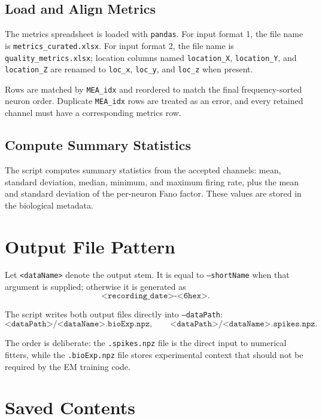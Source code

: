 \documentclass[11pt]{article}
\begin{document}
\subsection{Load and Align Metrics}

The metrics spreadsheet is loaded with \texttt{pandas}. For input format 1,
the file name is \texttt{metrics\_curated.xlsx}. For input format 2, the
file name is \texttt{quality\_metrics.xlsx}; location columns named
\texttt{location\_X}, \texttt{location\_Y}, and \texttt{location\_Z} are
renamed to \texttt{loc\_x}, \texttt{loc\_y}, and \texttt{loc\_z} when
present.

Rows are matched by \texttt{MEA\_idx} and reordered to match the final
frequency-sorted neuron order. Duplicate \texttt{MEA\_idx} rows are treated
as an error, and every retained channel must have a corresponding metrics
row.

\subsection{Compute Summary Statistics}

The script computes summary statistics from the accepted channels:
mean, standard deviation, median, minimum, and maximum firing rate, plus
the mean and standard deviation of the per-neuron Fano factor. These values
are stored in the biological metadata.

\section{Output File Pattern}
\label{sec:files}

Let \texttt{<dataName>} denote the output stem. It is equal to
\texttt{--shortName} when that argument is supplied; otherwise it is
generated as
\[
\texttt{<recording\_date>-<6hex>}.
\]

The script writes both output files directly into \texttt{--dataPath}:
\[
\texttt{<dataPath>/<dataName>.bioExp.npz},
\qquad
\texttt{<dataPath>/<dataName>.spikes.npz}.
\]

The order is deliberate: the \texttt{.spikes.npz} file is the direct input
to numerical fitters, while the \texttt{.bioExp.npz} file stores
experimental context that should not be required by the EM training code.

\section{Saved Contents}
\label{sec:saved}
\end{document}
